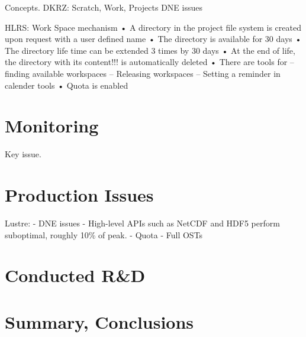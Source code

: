 \documentclass{superfri}
\numberwithin{equation}{section}
\begin{document}
Concepts.
DKRZ: Scratch, Work, Projects
DNE issues

HLRS: Work Space mechanism
• A directory in the project file system is created upon request
with a user defined name
• The directory is available for 30 days
• The directory life time can be extended 3 times by 30 days
• At the end of life, the directory with its content!!! is
automatically deleted
• There are tools for
– finding available workspaces
– Releasing workspaces
– Setting a reminder in calender tools
• Quota is enabled


\section{Monitoring}
\label{sec:monitoring}
Key issue.


\section{Production Issues}
\label{sec:issues}

Lustre:
- DNE issues
- High-level APIs such as NetCDF and HDF5 perform suboptimal, roughly 10\% of peak.
- Quota
- Full OSTs

\section{Conducted R\&D}
\label{sec:randd}

\section{Summary, Conclusions}
\label{sec:summary}




\end{document}
